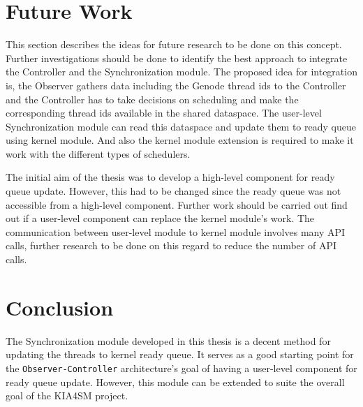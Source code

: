 \section{Future Work}\label{futurework}
This section describes the ideas for future research to be done on this concept. Further investigations should be done to identify the best approach to integrate the Controller and the Synchronization module. The proposed idea for integration is, the Observer gathers data including the Genode thread ids to the Controller and the Controller has to take decisions on scheduling and make the corresponding thread ids available in the shared dataspace. The user-level Synchronization module can read this dataspace and update them to ready queue using kernel module. And also the kernel module extension is required to make it work with the different types of schedulers.

The initial aim of the thesis was to develop a high-level component for ready queue update. However, this had to be changed since the ready queue was not accessible from a high-level component. Further work should be carried out find out if a user-level component can replace the kernel module's work. The communication between user-level module to kernel module involves many API calls, further research to be done on this regard to reduce the number of API calls.

\section{Conclusion}\label{con}
The Synchronization module developed in this thesis is a decent method for updating the threads to kernel ready queue. It serves as a good starting point for the \texttt{Observer-Controller} architecture's goal of having a user-level component for ready queue update. However, this module can be extended to suite the overall goal of the KIA4SM project.